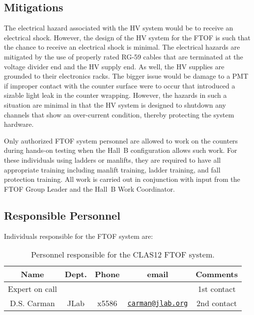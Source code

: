 \subsection{Mitigations}

The electrical hazard associated with the HV system would be to receive an electrical 
shock. However, the design of the HV system for the FTOF is such that the chance to receive an 
electrical shock is minimal. The electrical hazards are mitigated by the use of properly
rated RG-59 cables that are terminated at the voltage divider end and the HV supply end. As 
well, the HV supplies are grounded to their electronics racks. The bigger issue would be 
damage to a PMT if improper contact with the counter surface were to occur that introduced a 
sizable light leak in the counter wrapping. However, the hazards in such a situation are minimal 
in that the HV system is designed to shutdown any channels that show an over-current condition, 
thereby protecting the system hardware. 

Only authorized FTOF system personnel are allowed to work on the counters during hands-on
testing when the Hall~B configuration allows such work. For these individuals using ladders or 
manlifts, they are required to have all appropriate training including manlift training, ladder 
training, and fall protection training. All work is carried out in conjunction with input from
the FTOF Group Leader and the Hall~B Work Coordinator.

\subsection{Responsible Personnel}

Individuals responsible for the FTOF system are:

\begin{table}[!htb]
\centering
\begin{tabular}{|c|c|c|c|c|} \hline
Name           & Dept. & Phone & email & Comments \\ \hline
Expert on call &       &       &       & 1st contact \\ \hline
D.S. Carman    & JLab  & x5586 & \href{mailto:carman@jlab.org}{\nolinkurl{carman@jlab.org}} & 2nd contact \\ \hline
\end{tabular}
\caption{Personnel responsible for the CLAS12 FTOF system.} 
\label{tb:ftof}
\end{table}

